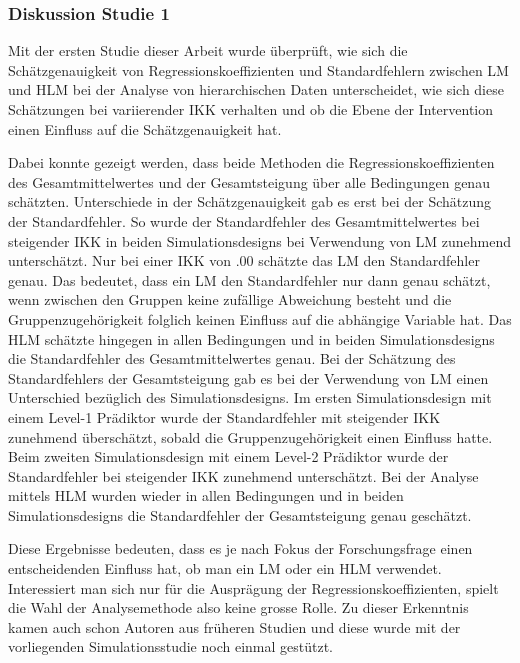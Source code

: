 \documentclass[12pt, a4paper]{article}\usepackage[]{graphicx}\usepackage[]{color}
\begin{document}
\subsubsection{Diskussion Studie 1}
Mit der ersten Studie dieser Arbeit wurde überprüft, wie sich die Schätzgenauigkeit von Regressionskoeffizienten und Standardfehlern zwischen LM und HLM bei der Analyse von hierarchischen Daten unterscheidet, wie sich diese Schätzungen bei variierender IKK verhalten und ob die Ebene der Intervention einen Einfluss auf die Schätzgenauigkeit hat. 

Dabei konnte gezeigt werden, dass beide Methoden die Regressionskoeffizienten des Gesamtmittelwertes und der Gesamtsteigung über alle Bedingungen genau schätzten. Unterschiede in der Schätzgenauigkeit gab es erst bei der Schätzung der Standardfehler. So wurde der Standardfehler des Gesamtmittelwertes bei steigender IKK in beiden Simulationsdesigns bei Verwendung von LM zunehmend unterschätzt. Nur bei einer IKK von .00 schätzte das LM den Standardfehler genau. Das bedeutet, dass ein LM den Standardfehler nur dann genau schätzt, wenn zwischen den Gruppen keine zufällige Abweichung besteht und die Gruppenzugehörigkeit folglich keinen Einfluss auf die abhängige Variable hat. Das HLM schätzte hingegen in allen Bedingungen und in beiden Simulationsdesigns die Standardfehler des Gesamtmittelwertes genau. Bei der Schätzung des Standardfehlers der Gesamtsteigung gab es bei der Verwendung von LM einen Unterschied bezüglich des Simulationsdesigns. Im ersten Simulationsdesign mit einem Level-1 Prädiktor wurde der Standardfehler mit steigender IKK zunehmend überschätzt, sobald die Gruppenzugehörigkeit einen Einfluss hatte. Beim zweiten Simulationsdesign mit einem Level-2 Prädiktor wurde der Standardfehler bei steigender IKK zunehmend unterschätzt. Bei der Analyse mittels HLM wurden wieder in allen Bedingungen und in beiden Simulationsdesigns die Standardfehler der Gesamtsteigung genau geschätzt.

Diese Ergebnisse bedeuten, dass es je nach Fokus der Forschungsfrage einen entscheidenden Einfluss hat, ob man ein LM oder ein HLM verwendet. Interessiert man sich nur für die Ausprägung der Regressionskoeffizienten, spielt die Wahl der Analysemethode also keine grosse Rolle. Zu dieser Erkenntnis kamen auch schon Autoren aus früheren Studien \citep{mcneish2014analyzing, mundfrom2002monte, osborne2000advantages} und diese wurde mit der vorliegenden Simulationsstudie noch einmal gestützt. 
\end{document}
